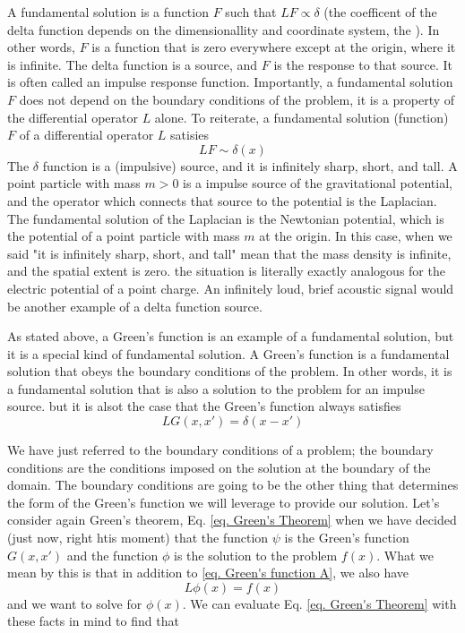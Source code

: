 \documentclass[../../main.tex]{subfiles} %
\begin{document}
A fundamental solution is a function $F$ such that $LF\propto\delta$ (the coefficent of the delta function depends on the dimensionallity and coordinate system, the ). In other words, $F$ is a function that is zero everywhere except at the origin, where it is infinite. The delta function is a source, and $F$ is the response to that source. It is often called an impulse response function. Importantly, a fundamental solution $F$ does not depend on the boundary conditions of the problem, it is a property of the differential operator $L$ alone. To reiterate, a fundamental solution (function) $F$ of a differential operator $L$ satisies
\begin{equation}\label{eq. fundamental solution}
    LF\sim\delta(x)
\end{equation}
The $\delta$ function is a (impulsive) source, and it is infinitely sharp, short, and tall. A point particle with mass $m>0$ is a impulse source of the gravitational potential, and the operator which connects that source to the potential is the Laplacian. The fundamental solution of the Laplacian is the Newtonian potential, which is the potential of a point particle with mass $m$ at the origin. In this case, when we said "it is infinitely sharp, short, and tall" mean that the mass density is infinite, and the spatial extent is zero. the situation is literally exactly analogous for the electric potential of a point charge. An infinitely loud, brief acoustic signal would be another example of a delta function source.

As stated above, a Green's function is an example of a fundamental solution, but it is a special kind of fundamental solution. A Green's function is a fundamental solution that obeys the boundary conditions of the problem. In other words, it is a fundamental solution that is also a solution to the problem for an impulse source. but it is alsot the case that the Green's function always satisfies
\begin{equation}\label{eq. Green's function A}
    LG(x,x')=\delta(x-x')
\end{equation}

We have just referred to the boundary conditions of a problem; the boundary conditions are the conditions imposed on the solution at the boundary of the domain. The boundary conditions are going to be the other thing that determines the form of the Green's function we will leverage to provide our solution. Let's consider again Green's theorem, Eq. \ref{eq. Green's Theorem} when we have decided 
(just now, right htis moment) that the function $\psi$ is the Green's function $G(x,x')$ and the function $\phi$ is the solution to the problem $f(x)$. What we mean by this is that in addition to \ref{eq. Green's function A}, we also have 
\begin{equation}
    L\phi(x)=f(x)
\end{equation}
and we want to solve for $\phi(x)$. We can evaluate Eq. \ref{eq. Green's Theorem} with these facts in mind to find that 
\end{document}
